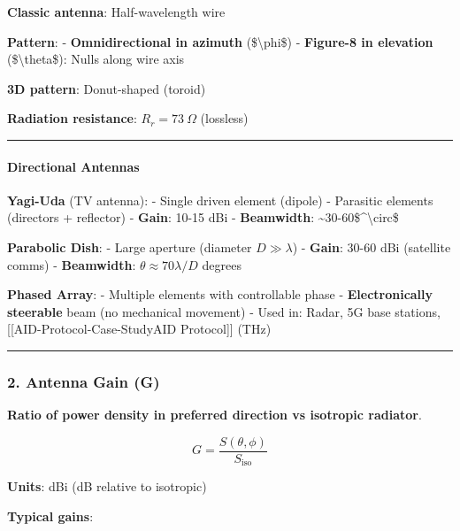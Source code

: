 \textbf{Classic antenna}: Half-wavelength wire

\textbf{Pattern}: - \textbf{Omnidirectional in azimuth}
(\$\textbackslash phi\$) - \textbf{Figure-8 in elevation}
(\$\textbackslash theta\$): Nulls along wire axis

\textbf{3D pattern}: Donut-shaped (toroid)

\textbf{Radiation resistance}: \(R_r = 73\ \Omega\) (lossless)

\begin{center}\rule{0.5\linewidth}{0.5pt}\end{center}

\paragraph{Directional Antennas}\label{directional-antennas}

\textbf{Yagi-Uda} (TV antenna): - Single driven element (dipole) -
Parasitic elements (directors + reflector) - \textbf{Gain}: 10-15 dBi -
\textbf{Beamwidth}: \textasciitilde30-60\$\^{}\textbackslash circ\$

\textbf{Parabolic Dish}: - Large aperture (diameter \(D \gg \lambda\)) -
\textbf{Gain}: 30-60 dBi (satellite comms) - \textbf{Beamwidth}:
\(\theta \approx 70 \lambda / D\) degrees

\textbf{Phased Array}: - Multiple elements with controllable phase -
\textbf{Electronically steerable} beam (no mechanical movement) - Used
in: Radar, 5G base stations, {[}{[}AID-Protocol-Case-Study\textbar AID
Protocol{]}{]} (THz)

\begin{center}\rule{0.5\linewidth}{0.5pt}\end{center}

\subsubsection{2. Antenna Gain (G)}\label{antenna-gain-g}

\textbf{Ratio of power density in preferred direction vs isotropic
radiator}.

\[
G = \frac{S(\theta, \phi)}{S_{\text{iso}}}
\]

\textbf{Units}: dBi (dB relative to isotropic)

\textbf{Typical gains}:

